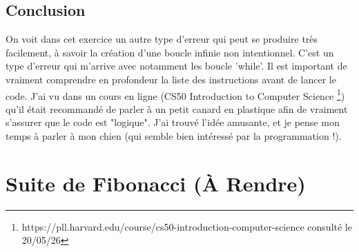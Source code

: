 \begin{graybox}
    \subsection{Conclusion}

    On voit dans cet exercice un autre type d'erreur qui peut se produire très facilement,
    à savoir la création d'une boucle infinie non intentionnel. C'est un type d'erreur qui  
    m'arrive avec notamment les boucle 'while'. Il est important de vraiment comprendre
    en profondeur la liste des instructions avant de lancer le code. J'ai vu dans un cours
    en ligne (CS50 Introduction to Computer Science \footnote{https://pll.harvard.edu/course/cs50-introduction-computer-science consulté le 20/05/26})
    qu'il était recommandé de parler à un petit canard en plastique afin de vraiment s'assurer
    que le code est "logique". J'ai trouvé l'idée amusante, et je pense mon temps à parler à 
    mon chien (qui semble bien intéressé par la programmation !). 

\end{graybox}

\newpage


\section{Suite de Fibonacci (À Rendre)}



